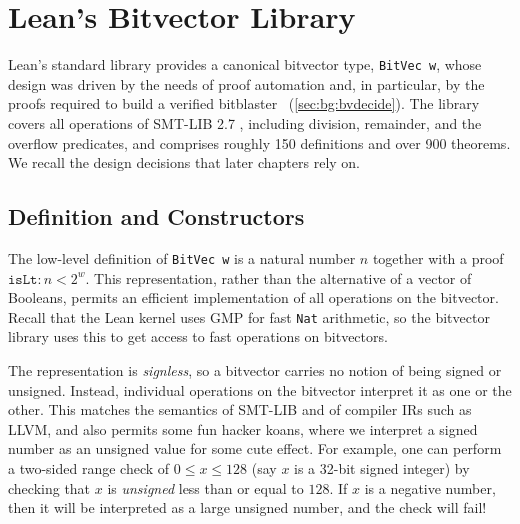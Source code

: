 

\section{Lean's Bitvector Library}
\label{sec:bg:bitvec}

Lean's standard library provides a canonical bitvector type,
\texttt{BitVec w}, whose design was driven by the needs of proof automation
and, in particular, by the proofs required to build a verified
bitblaster~\citep{leanbv} (\cref{sec:bg:bvdecide}). The library covers all
operations of SMT-LIB 2.7 \qfbv{}, including division, remainder, and the
overflow predicates, and comprises roughly 150 definitions and over 900
theorems. We recall the design decisions that later chapters rely on.

\subsection{Definition and Constructors}

The low-level definition of \texttt{BitVec w} is a natural number $n$ together
with a proof $\texttt{isLt} : n < 2^w$. This representation, rather than the alternative of a vector of Booleans,
permits an efficient implementation of all operations on the bitvector.
Recall that the Lean kernel uses GMP for fast \texttt{Nat} arithmetic,
so the bitvector library uses this to get access to fast operations on bitvectors.


The representation is \emph{signless}, so a bitvector carries no notion of being signed or unsigned.
Instead, individual operations on the bitvector interpret it as one or the other.
This matches the semantics of SMT-LIB and of compiler IRs such as LLVM,
and also permits some fun hacker koans, where we interpret a signed number as an unsigned value for some cute effect.
For example, one can perform a two-sided range check of $0 \leq x \leq 128$ (say $x$ is a 32-bit signed integer)
by checking that $x$ is \emph{unsigned} less than or equal to $128$.
If $x$ is a negative number, then it will be interpreted as a large unsigned number, and the check will fail!

